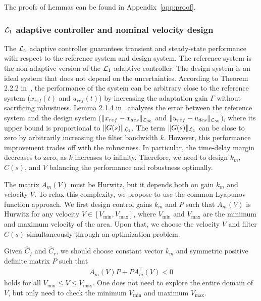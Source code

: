 \documentclass[letterpaper, 10 pt, conference]{ieeeconf}
\begin{document}
The proofs of Lemmas can be found in Appendix~\ref{app:proof}.

\subsubsection{$\mathcal{L}_1$ adaptive controller and nominal velocity design}\label{sec:L1vehicle}

The $\mathcal{L}_1$ adaptive controller guarantees transient and steady-state performance with respect to the reference system and design system. The reference system is the non-adaptive version of the $\mathcal{L}_1$ adaptive controller.
The design system is an ideal system that does not depend on the uncertainties. According to Theorem 2.2.2 in~\cite{hovakimyan2010L1}, the performance of the system can be arbitrary close to the reference system ($x_{ref}(t)$ and $u_{ref}(t)$) by increasing the adaptation gain $\Gamma$ without sacrificing robustness.
Lemma 2.1.4 in~\cite{hovakimyan2010L1} analyzes the error between the reference system and the design system ($\|x_{ref}-x_{des}\|_{\mathcal{L}_{\infty}}$ and $\|u_{ref}-u_{des}\|_{\mathcal{L}_{\infty}}$),
where its upper bound is proportional to $\|G(s)\|_{\mathcal{L}_1}$.
The term $\|G(s)\|_{\mathcal{L}_1}$ can be close to zero by arbitrarily increasing the filter bandwidth $k$. However, this performance improvement trades off with the robustness.
In particular, the time-delay margin decreases to zero, as $k$ increases to infinity. Therefore, we need to design $k_m$, $C(s)$, and $V$ balancing the performance and robustness optimally.


The matrix $A_m(V)$ must be Hurwitz, but it depends both on gain $k_m$ and velocity $V$. To relax this complexity, we propose to use the common Lyapunov function approach. We first design control gains $k_m$ and $P$ such that $A_m(V)$ is Hurwitz for any velocity $V \in [V_{\min},V_{\max}]$,
where $V_{\min}$ and $V_{\max}$ are the minimum and maximum velocity of the area.
Upon that, we  choose the velocity $V$ and filter $C(s)$ simultaneously through an optimization problem.

Given $\hat{C}_f$ and $\hat{C}_r$, we should choose constant vector $k_m$ and symmetric positive definite matrix $P$ such that
\begin{align}
    A_m(V) P + P A_m^\top(V) <0
    \label{eq:lyap}
\end{align}
holds for all $V_{\min} \leq V \leq V_{\max}$.
One does not need to explore the entire domain of $V$, but only need to check the minimum $V_{\min}$ and maximum $V_{\max}$. 
\end{document}
